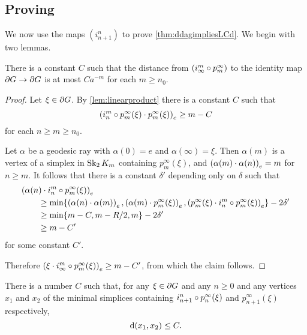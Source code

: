 \documentclass[a4paper]{article}
\begin{document}
\subsection{Proving }

We now use the maps $(i^n_{n+1})$ to prove \cref{thm:ddagimpliesLCd}. We begin
with two lemmas.

\begin{lemma}\label{lem:convergestoidentity}
  There is a constant $C$ such that the distance from $(i^m_\infty \composed 
  p^\infty_m)$ to the identity map $\boundary G\to\boundary G$ is at most 
  $Ca^{-m}$ for each $m \geq n_0$.
\end{lemma}

\begin{proof}
  Let $\xi \in \boundary G$. By \cref{lem:linearproduct} there is a 
  constant $C$ such that 
  \begin{equation*}
    \gromov{e}{i^m_n\composed p^\infty_m(\xi)}{p^\infty_m(\xi)} \geq m - C
  \end{equation*} 
  for each $n\geq m\geq n_0$. 

  Let $\alpha$ be a geodesic ray with $\alpha(0) = e$ and $\alpha(\infty) = 
  \xi$. Then $\alpha(m)$ is a vertex of a simplex in $\Skel_2K_m$ containing 
  $p^\infty_m(\xi)$, and $\gromov{e}{\alpha(m)}{\alpha(n)} = m$ for $n\geq m$.
  It follows that there is a constant $\delta'$ depending only on $\delta$ such 
  that
  \begin{align*}
    \mathrlap{\gromov{e}{\alpha(n)}{i^m_n\composed p^\infty_m(\xi)}}\quad\quad &\\
          & \geq \min\{\gromov{e}{\alpha(n)}{\alpha(m)}, 
            \gromov{e}{\alpha(m)}{p^\infty_m(\xi)}, 
            \gromov{e}{p^\infty_m(\xi)}{i^m_n\composed p^\infty_m(\xi)}\} 
            - 2\delta' \\
          &\geq \min\{m - C, m - R/2, m\} - 2\delta' \\
          &\geq m - C'
  \end{align*}
  for some constant $C'$.

  Therefore $\gromov{e}{\xi}{i^m_\infty\composed p^\infty_m(\xi)} \geq m - C'$, 
  from which the claim follows.
\end{proof}

\begin{lemma}\label{lem:name_this}
  There is a number $C$ such that, for any $\xi \in \boundary G$ and any $n
  \geq 0$ and any vertices $x_1$ and $x_2$ of the minimal simplices containing
  $i^n_{n+1}\composed p^\infty_n(\xi)$ and $p^\infty_{n+1}(\xi)$ respectively,
  \begin{equation*}
    \dist(x_1, x_2) \leq C.
  \end{equation*}
\end{lemma}
\end{document}
